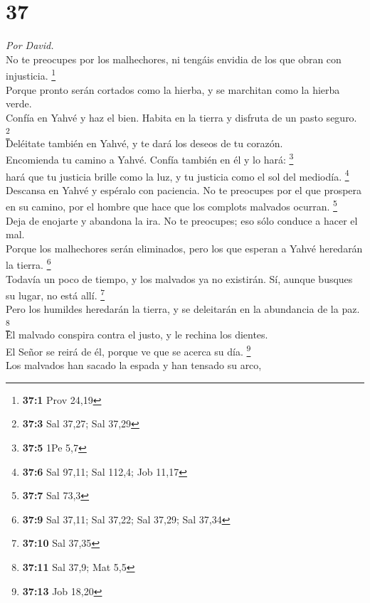 \hypertarget{section-36}{%
\section{37}\label{section-36}}

\emph{Por David.}\\
 No te preocupes por los malhechores, ni tengáis envidia
de los que obran con injusticia. \footnote{\textbf{37:1} Prov 24,19}\\
 Porque pronto serán cortados como la hierba, y se
marchitan como la hierba verde.\\
 Confía en Yahvé y haz el bien. Habita en la tierra y
disfruta de un pasto seguro. \footnote{\textbf{37:3} Sal 37,27; Sal
  37,29}\\
 Deléitate también en Yahvé, y te dará los deseos de tu
corazón.\\
 Encomienda tu camino a Yahvé. Confía también en él y lo
hará: \footnote{\textbf{37:5} 1Pe 5,7}\\
 hará que tu justicia brille como la luz, y tu justicia
como el sol del mediodía. \footnote{\textbf{37:6} Sal 97,11; Sal 112,4;
  Job 11,17}\\
 Descansa en Yahvé y espéralo con paciencia. No te
preocupes por el que prospera en su camino, por el hombre que hace que
los complots malvados ocurran. \footnote{\textbf{37:7} Sal 73,3}\\
 Deja de enojarte y abandona la ira. No te preocupes; eso
sólo conduce a hacer el mal.\\
 Porque los malhechores serán eliminados, pero los que
esperan a Yahvé heredarán la tierra. \footnote{\textbf{37:9} Sal 37,11;
  Sal 37,22; Sal 37,29; Sal 37,34}\\
 Todavía un poco de tiempo, y los malvados ya no
existirán. Sí, aunque busques su lugar, no está allí. \footnote{\textbf{37:10}
  Sal 37,35}\\
 Pero los humildes heredarán la tierra, y se deleitarán
en la abundancia de la paz. \footnote{\textbf{37:11} Sal 37,9; Mat 5,5}\\
 El malvado conspira contra el justo, y le rechina los
dientes.\\
 El Señor se reirá de él, porque ve que se acerca su día.
\footnote{\textbf{37:13} Job 18,20}\\
 Los malvados han sacado la espada y han tensado su arco,
